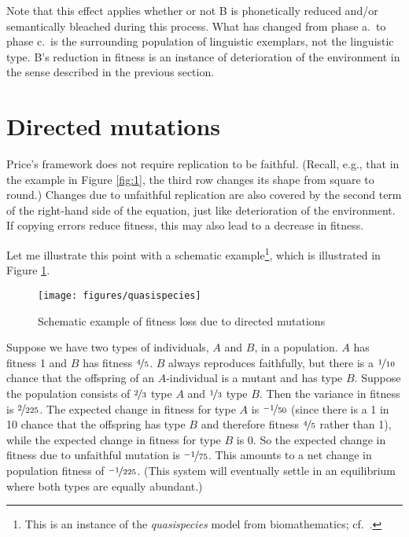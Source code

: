 \documentclass[output=paper,hidelinks]{langscibook}
\begin{document}
Note that this effect applies whether or not B is phonetically reduced and/or semantically
bleached during this process. What has changed from phase a.\ to phase c.\ is the
surrounding population of linguistic exemplars, not the linguistic type. B's reduction in
fitness is an instance of deterioration of the environment in the sense described in the
previous section.

\section{Directed mutations}

Price's framework does not require replication to be faithful. (Recall, e.g., that in the
example in Figure \ref{fig:1}, the third row changes its shape from square to round.)
Changes due to unfaithful replication are also covered by the second term of the
right-hand side of the equation, just like deterioration of the environment. If copying
errors reduce fitness, this may also lead to a decrease in fitness.

Let me illustrate this point with a schematic example\footnote{This is an instance of the
  \emph{quasispecies} model from biomathematics; cf.\ \citep{eigenSchuster79}.}, which is
illustrated in Figure \ref{fig:2}.
\begin{figure}
  \centering
  \texttt{[image: figures/quasispecies]}
  \caption{Schematic example of fitness loss due to directed mutations}
  \label{fig:2}
\end{figure}
Suppose we have two types of individuals, $A$ and $B$, in a population. $A$ has fitness 1
and $B$ has fitness $\nicefrac{4}{5}$. $B$ always reproduces faithfully, but there is a
$\nicefrac{1}{10}$ chance that the offspring of an $A$-individual is a mutant and has type
$B$. Suppose the population consists of $\nicefrac{2}{3}$ type $A$ and $\nicefrac{1}{3}$
type $B$. Then the variance in fitness is $\nicefrac{2}{225}$. The expected change in
fitness for type $A$ is $\nicefrac{-1}{50}$ (since there is a 1 in 10 chance that the
offspring has type $B$ and therefore fitness $\nicefrac{4}{5}$ rather than 1), while the
expected change in fitness for type $B$ is 0. So the expected change in fitness due to
unfaithful mutation is $\nicefrac{-1}{75}$. This amounts to a net change in population
fitness of $\nicefrac{-1}{225}$. (This system will eventually settle in an equilibrium
where both types are equally abundant.)
\end{document}
